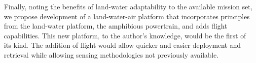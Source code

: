 \begin{singlespace}
Finally, noting the benefits of land-water adaptability to the available mission set, we propose development of a land-water-air platform that incorporates principles from the land-water platform, the amphibious powertrain, and adds flight capabilities. This new platform, to the author's knowledge, would be the first of its kind. The addition of flight would allow quicker and easier deployment and retrieval while allowing sensing methodologies not previously available.


\end{singlespace}